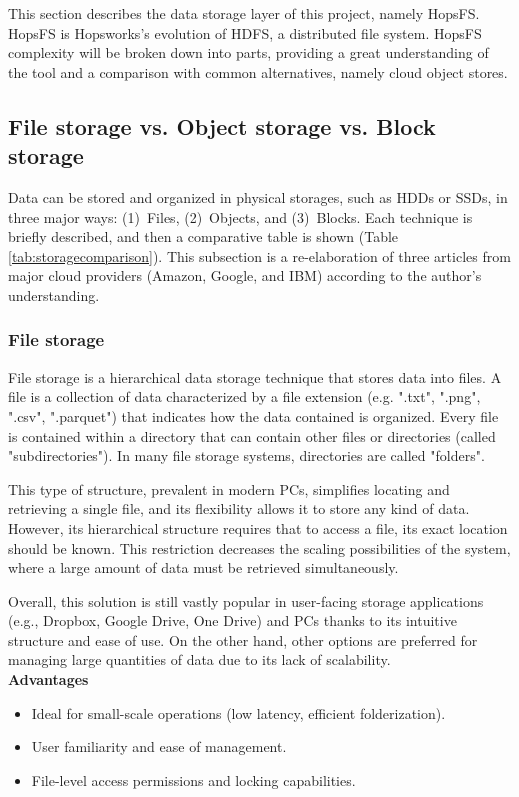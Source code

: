 This section describes the data storage layer of this project, namely \gls{HopsFS}. \gls{HopsFS} is Hopsworks's evolution of \gls{HDFS}, a distributed file system. \gls{HopsFS} complexity will be broken down into parts, providing a great understanding of the tool and a comparison with common alternatives, namely cloud object stores.

\subsection{File storage vs. Object storage vs. Block storage}
\label{subsec:file_vs_obj_vs_block}

Data can be stored and organized in physical storages, such as \glspl{HDD} or \glspl{SSD}, in three major ways: (1)~Files, (2)~Objects, and (3)~Blocks. Each technique is briefly described, and then a comparative table is shown (Table \ref{tab:storagecomparison}). This subsection is a re-elaboration of three articles from major cloud providers (Amazon, Google, and IBM) \cite{BlockVsFile, HowObjectVs, ObjectVsFile2021} according to the author's understanding.

\subsubsection*{File storage}

File storage is a hierarchical data storage technique that stores data into files. A file is a collection of data characterized by a file extension (e.g. ".txt", ".png", ".csv", ".parquet") that indicates how the data contained is organized. Every file is contained within a directory that can contain other files or directories (called "subdirectories"). In many file storage systems, directories are called "folders". 

This type of structure, prevalent in modern \glspl{PC}, simplifies locating and retrieving a single file, and its flexibility allows it to store any kind of data. However, its hierarchical structure requires that to access a file, its exact location should be known. This restriction decreases the scaling possibilities of the system, where a large amount of data must be retrieved simultaneously.

Overall, this solution is still vastly popular in user-facing storage applications (e.g., Dropbox, Google Drive, One Drive) and \glspl{PC} thanks to its intuitive structure and ease of use. On the other hand, other options are preferred for managing large quantities of data due to its lack of scalability. \\[3mm]
\noindent\textbf{Advantages}
\begin{itemize}
    \item Ideal for small-scale operations (low latency, efficient folderization).
    \item User familiarity and ease of management.
    \item File-level access permissions and locking capabilities.
\end{itemize}

